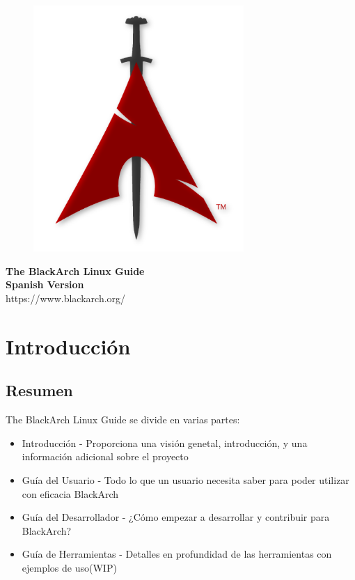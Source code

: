 \documentclass[a4paper, oneside, 11pt]{book}
\begin{document}
\pagestyle{empty}
\begin{center}
\begin{figure}[htbp]
\centering
\vspace{0.5cm}
\includegraphics[width=8cm]{images/logo.png}
\label{fig:logo}
\end{figure}
\vspace{0.5cm}
\Huge{\textbf{The BlackArch Linux Guide}}\\
\vspace{0.5cm}
\Large{\textbf{Spanish Version}}\\
\vspace{1cm}
\Large{\color{red}https://www.blackarch.org/}\\
\vspace{0.5cm}
\end{center}
\newpage
\tableofcontents
\newpage
\pagestyle{fancy}


\chapter{Introducci\'on}

\section{Resumen}
The BlackArch Linux Guide se divide en varias partes:
\begin{itemize}
\item Introducci\'on - Proporciona una visi\'on genetal, introducci\'on, y una informaci\'on adicional sobre el proyecto
\item Gu\'ia del Usuario - Todo lo que un usuario necesita saber para poder utilizar con eficacia BlackArch
\item Gu\'ia del Desarrollador - ¿Cómo empezar a desarrollar y contribuir para BlackArch?
\item Gu\'ia de Herramientas - Detalles en profundidad de las herramientas con ejemplos de uso(WIP)
\end{itemize}
\end{document}
